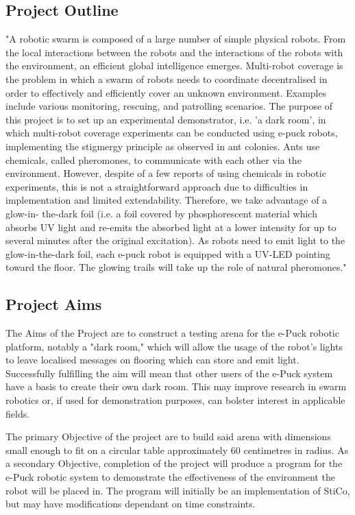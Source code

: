 \subsection{Project Outline} \label{desProOut}
"A robotic swarm is composed of a large number of simple physical robots. From
the local interactions between the robots and the interactions of the robots
with the environment, an efficient global intelligence emerges. Multi-robot
coverage is the problem in which a swarm of robots needs to coordinate
decentralised in order to effectively and efficiently cover an unknown
environment. Examples include various monitoring, rescuing, and patrolling
scenarios. The purpose of this project is to set up an experimental
demonstrator, i.e. 'a dark room', in which multi-robot coverage experiments can
be conducted using e-puck robots, implementing the stigmergy principle as
observed in ant colonies. Ants use chemicals, called pheromones, to communicate
with each other via the environment. However, despite of a few reports of using
chemicals in robotic experiments, this is not a straightforward approach due to
difficulties in implementation and limited extendability. Therefore, we take
advantage of a glow-in- the-dark foil (i.e. a foil covered by phosphorescent
material which absorbs UV light and re-emits the absorbed light at a lower
intensity for up to several minutes after the original excitation). As robots
need to emit light to the glow-in-the-dark foil, each e-puck robot is equipped
with a UV-LED pointing toward the floor. The glowing trails will take up the
role of natural pheromones."

\subsection{Project Aims} \label{desProAim}
The Aims of the Project are to construct a testing arena for the e-Puck robotic 
platform, notably a "dark room," which will allow the usage of the robot's
lights to leave localised messages on flooring which can store and emit light.
Successfully fulfilling the aim will mean that other users of the e-Puck system
have a basis to create their own dark room.  This may improve research in swarm
robotics or, if used for demonstration purposes, can bolster interest in
applicable fields.

The primary Objective of the project are to build said arena with dimensions
small enough to fit on a circular table approximately 60 centimetres in radius.
As a secondary Objective, completion of the project will produce a program for
the e-Puck robotic system to demonstrate the effectiveness of the environment 
the robot will be placed in.  The program will initially be an implementation of
StiCo\cite{Ranjbar-Sahraei2012Demo}, but may have modifications dependant on
time constraints.

